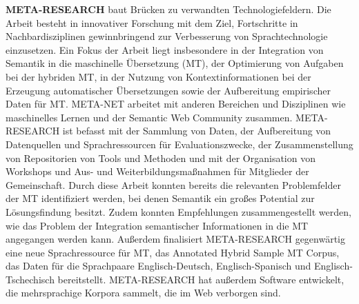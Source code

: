 \documentclass[]{../../metanetpaper}
\begin{document}
\begin{multicols}{2}
\textbf{META-RESEARCH} baut Brücken zu verwandten Technologiefeldern. Die Arbeit besteht in innovativer Forschung mit dem Ziel, Fortschritte in Nachbardisziplinen gewinnbringend zur Verbesserung von Sprachtechnologie einzusetzen. Ein Fokus der Arbeit liegt insbesondere in der Integration von Semantik in die maschinelle Übersetzung (MT), der Optimierung von Aufgaben bei der hybriden MT, in der Nutzung von Kontextinformationen bei der Erzeugung automatischer Übersetzungen sowie der Aufbereitung empirischer Daten für MT. META-NET arbeitet mit anderen Bereichen und Disziplinen wie maschinelles Lernen und der Semantic Web Community zusammen. META-RESEARCH ist befasst mit der Sammlung von Daten, der Aufbereitung von Datenquellen und Sprachressourcen für Evaluationszwecke, der Zusammenstellung von Repositorien von Tools und Methoden und mit der Organisation von Workshops und Aus- und Weiterbildungsmaßnahmen für Mitglieder der Gemeinschaft. Durch diese Arbeit konnten bereits die relevanten Problemfelder der MT identifiziert werden, bei denen Semantik ein großes Potential zur Lösungsfindung besitzt. Zudem konnten Empfehlungen zusammengestellt werden, wie das Problem der Integration semantischer Informationen in die MT angegangen werden kann. Außerdem finalisiert META-RESEARCH gegenwärtig eine neue Sprachressource für MT, das Annotated Hybrid Sample MT Corpus, das Daten für die Sprachpaare Englisch-Deutsch, Englisch-Spanisch und Englisch-Tschechisch bereitstellt. META-RESEARCH hat außerdem Software entwickelt, die mehrsprachige Korpora sammelt, die im Web verborgen sind.
\end{multicols}


\setcounter{section}{0}
\setcounter{figure}{0}

\cleardoublepage


\end{document}
